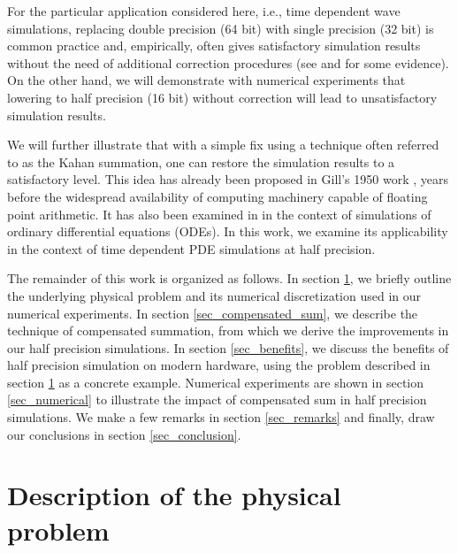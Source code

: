 \documentclass[10pt]{article}
\begin{document}
For the particular application considered here, i.e., time dependent wave simulations, replacing double precision (64 bit) with single precision (32 bit) is common practice and, empirically, often gives satisfactory simulation results without the need of additional correction procedures (see \cite[p.14]{manual2021specfem3d} and \cite{abdelkhalek2009fast,heinecke2019tensor} for some evidence).
%
On the other hand, we will demonstrate with numerical experiments that lowering to half precision (16 bit) without correction will lead to unsatisfactory simulation results. 


We will further illustrate that with a simple fix using a technique often referred to as the Kahan summation, one can restore the simulation results to a satisfactory level.
%
This idea has already been proposed in Gill's 1950 work \cite{gill1951process}, years before the widespread availability of computing machinery capable of floating point arithmetic. 
%
It has also been examined in \cite{linnainmaa1974analysis} in the context of simulations of ordinary differential equations (ODEs).
%
In this work, we examine its applicability in the context of time dependent PDE simulations at half precision.


The remainder of this work is organized as follows. 
%
In section \ref{sec_problem_description}, we briefly outline the underlying physical problem and its numerical discretization used in our numerical experiments.
%
In section \ref{sec_compensated_sum}, we describe the technique of compensated summation, from which we derive the improvements in our half precision simulations.
%
In section \ref{sec_benefits}, we discuss the benefits of half precision simulation on modern hardware, using the problem described in section \ref{sec_problem_description} as a concrete example.
%
Numerical experiments are shown in section \ref{sec_numerical} to illustrate the impact of compensated sum in half precision simulations. 
%
We make a few remarks in section \ref{sec_remarks} and finally, draw our conclusions in section \ref{sec_conclusion}.


\section{Description of the physical problem}\label{sec_problem_description}
\end{document}
